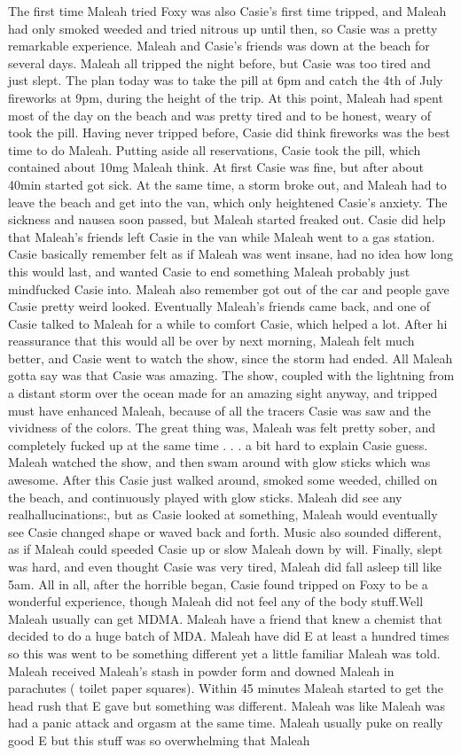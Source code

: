 \documentclass[12pt]{book}
\begin{document}
The first time Maleah tried Foxy was also Casie's first time tripped, and Maleah had only smoked weeded and tried nitrous up until then, so Casie was a pretty remarkable experience. Maleah and Casie's friends was down at the beach for several days. Maleah all tripped the night before, but Casie was too tired and just slept. The plan today was to take the pill at 6pm and catch the 4th of July fireworks at 9pm, during the height of the trip. At this point, Maleah had spent most of the day on the beach and was pretty tired and to be honest, weary of took the pill. Having never tripped before, Casie did think fireworks was the best time to do Maleah. Putting aside all reservations, Casie took the pill, which contained about 10mg Maleah think. At first Casie was fine, but after about 40min started got sick. At the same time, a storm broke out, and Maleah had to leave the beach and get into the van, which only heightened Casie's anxiety. The sickness and nausea soon passed, but Maleah started freaked out. Casie did help that Maleah's friends left Casie in the van while Maleah went to a gas station. Casie basically remember felt as if Maleah was went insane, had no idea how long this would last, and wanted Casie to end something Maleah probably just mindfucked Casie into. Maleah also remember got out of the car and people gave Casie pretty weird looked. Eventually Maleah's friends came back, and one of Casie talked to Maleah for a while to comfort Casie, which helped a lot. After hi reassurance that this would all be over by next morning, Maleah felt much better, and Casie went to watch the show, since the storm had ended. All Maleah gotta say was that Casie was amazing. The show, coupled with the lightning from a distant storm over the ocean made for an amazing sight anyway, and tripped must have enhanced Maleah, because of all the tracers Casie was saw and the vividness of the colors. The great thing was, Maleah was felt pretty sober, and completely fucked up at the same time . . . a bit hard to explain Casie guess. Maleah watched the show, and then swam around with glow sticks which was awesome. After this Casie just walked around, smoked some weeded, chilled on the beach, and continuously played with glow sticks. Maleah did see any realhallucinations:, but as Casie looked at something, Maleah would eventually see Casie changed shape or waved back and forth. Music also sounded different, as if Maleah could speeded Casie up or slow Maleah down by will. Finally, slept was hard, and even thought Casie was very tired, Maleah did fall asleep till like 5am. All in all, after the horrible began, Casie found tripped on Foxy to be a wonderful experience, though Maleah did not feel any of the body stuff.Well Maleah usually can get MDMA. Maleah have a friend that knew a chemist that decided to do a huge batch of MDA. Maleah have did E at least a hundred times so this was went to be something different yet a little familiar Maleah was told. Maleah received Maleah's stash in powder form and downed Maleah in parachutes ( toilet paper squares). Within 45 minutes Maleah started to get the head rush that E gave but something was different. Maleah was like Maleah was had a panic attack and orgasm at the same time. Maleah usually puke on really good E but this stuff was so overwhelming that Maleah 
\end{document}
